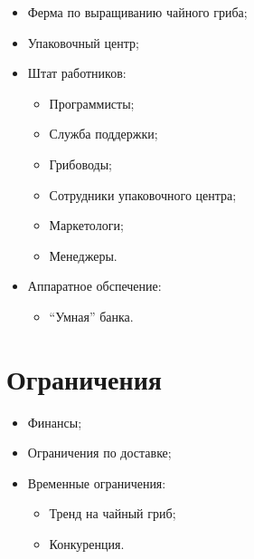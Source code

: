 \documentclass[a4paper,8pt]{article}
\begin{document}
    \begin{itemize}
        \item Ферма по выращиванию чайного гриба;
        \item Упаковочный центр;
        \item Штат работников:
            \begin{itemize}
                \item Программисты;
                \item Служба поддержки;
                \item Грибоводы;
                \item Сотрудники упаковочного центра;
                \item Маркетологи;
                \item Менеджеры.
            \end{itemize}
        \item Аппаратное обспечение:
            \begin{itemize}
                \item “Умная” банка.
            \end{itemize}
    \end{itemize}


\section*{Ограничения}

    \begin{itemize}
        \item Финансы;
        \item Ограничения по доставке;
        \item Временные ограничения:
            \begin{itemize}
                \item Тренд на чайный гриб;
                \item Конкуренция.
            \end{itemize}
    \end{itemize}
\end{document}
